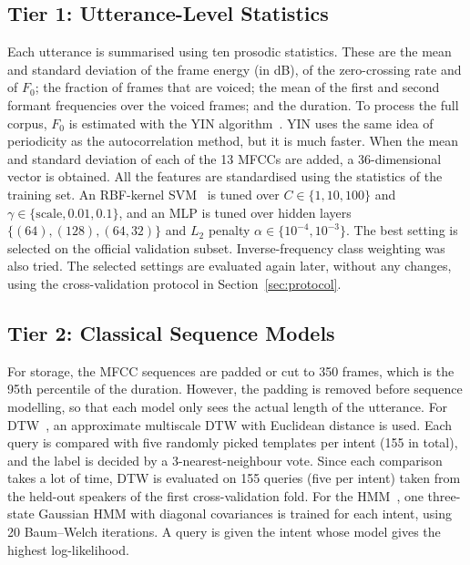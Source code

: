 \documentclass[conference]{IEEEtran}
\begin{document}
\subsection{Tier 1: Utterance-Level Statistics}
Each utterance is summarised using ten prosodic statistics. These are the mean and standard deviation of the frame energy (in dB), of the zero-crossing rate and of $F_0$; the fraction of frames that are voiced; the mean of the first and second formant frequencies over the voiced frames; and the duration. To process the full corpus, $F_0$ is estimated with the YIN algorithm~\cite{decheveigne2002yin}. YIN uses the same idea of periodicity as the autocorrelation method, but it is much faster. When the mean and standard deviation of each of the 13 MFCCs are added, a 36-dimensional vector is obtained. All the features are standardised using the statistics of the training set. An RBF-kernel SVM~\cite{cortes1995svm} is tuned over $C \in \{1, 10, 100\}$ and $\gamma \in \{\text{scale}, 0.01, 0.1\}$, and an MLP is tuned over hidden layers $\{(64), (128), (64, 32)\}$ and $L_2$ penalty $\alpha \in \{10^{-4}, 10^{-3}\}$. The best setting is selected on the official validation subset. Inverse-frequency class weighting was also tried. The selected settings are evaluated again later, without any changes, using the cross-validation protocol in Section~\ref{sec:protocol}.

\subsection{Tier 2: Classical Sequence Models}
For storage, the MFCC sequences are padded or cut to 350 frames, which is the 95th percentile of the duration. However, the padding is removed before sequence modelling, so that each model only sees the actual length of the utterance. For DTW~\cite{sakoe1978dtw}, an approximate multiscale DTW with Euclidean distance is used. Each query is compared with five randomly picked templates per intent (155 in total), and the label is decided by a 3-nearest-neighbour vote. Since each comparison takes a lot of time, DTW is evaluated on 155 queries (five per intent) taken from the held-out speakers of the first cross-validation fold. For the HMM~\cite{rabiner1989hmm}, one three-state Gaussian HMM with diagonal covariances is trained for each intent, using 20 Baum--Welch iterations. A query is given the intent whose model gives the highest log-likelihood.
\end{document}
